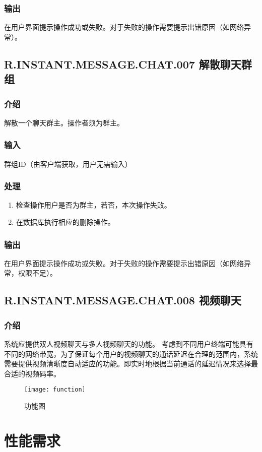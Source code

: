 \subsubsection{输出}
在用户界面提示操作成功或失败。对于失败的操作需要提示出错原因（如网络异常）。
\subsection{R.INSTANT.MESSAGE.CHAT.007 解散聊天群组}
\subsubsection{介绍}
解散一个聊天群主。操作者须为群主。
\subsubsection{输入}
群组ID（由客户端获取，用户无需输入）
\subsubsection{处理}
\begin{enumerate}
	\item 检查操作用户是否为群主，若否，本次操作失败。
	\item 在数据库执行相应的删除操作。
\end{enumerate}
\subsubsection{输出}
在用户界面提示操作成功或失败。对于失败的操作需要提示出错原因（如网络异常，权限不足）。
\subsection{R.INSTANT.MESSAGE.CHAT.008 视频聊天}
\subsubsection{介绍}
系统应提供双人视频聊天与多人视频聊天的功能。
{
	\color{red}
	考虑到不同用户终端可能具有不同的网络带宽，为了保证每个用户的视频聊天的通话延迟在合理的范围内，系统需要提供视频清晰度自动适应的功能。即实时地根据当前通话的延迟情况来选择最合适的视频码率。\\
}
\begin{figure}[h]
	\centering
	\texttt{[image: function]}
	\caption{功能图} \label{fig:function}
\end{figure}

\section{性能需求}

